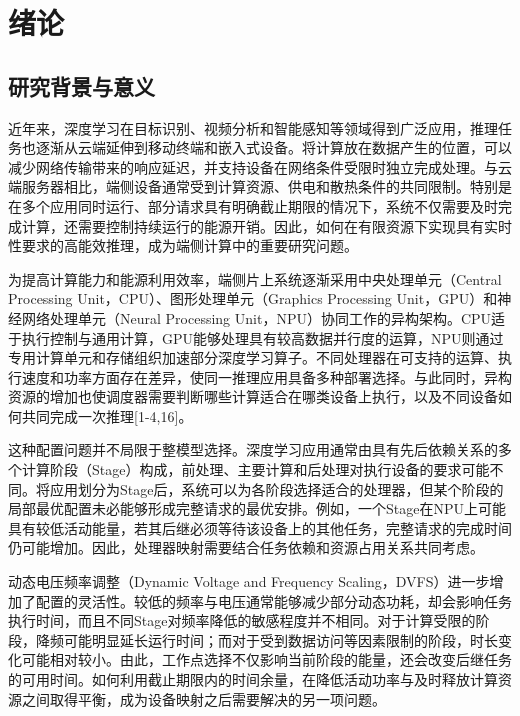 \chapter{绪论}\label{ux7eeaux8bba}

\section{研究背景与意义}\label{ux7814ux7a76ux80ccux666fux4e0eux610fux4e49}

近年来，深度学习在目标识别、视频分析和智能感知等领域得到广泛应用，推理任务也逐渐从云端延伸到移动终端和嵌入式设备。将计算放在数据产生的位置，可以减少网络传输带来的响应延迟，并支持设备在网络条件受限时独立完成处理。与云端服务器相比，端侧设备通常受到计算资源、供电和散热条件的共同限制。特别是在多个应用同时运行、部分请求具有明确截止期限的情况下，系统不仅需要及时完成计算，还需要控制持续运行的能源开销。因此，如何在有限资源下实现具有实时性要求的高能效推理，成为端侧计算中的重要研究问题。

为提高计算能力和能源利用效率，端侧片上系统逐渐采用中央处理单元（Central Processing Unit，CPU）、图形处理单元（Graphics Processing Unit，GPU）和神经网络处理单元（Neural Processing Unit，NPU）协同工作的异构架构。CPU适于执行控制与通用计算，GPU能够处理具有较高数据并行度的运算，NPU则通过专用计算单元和存储组织加速部分深度学习算子。不同处理器在可支持的运算、执行速度和功率方面存在差异，使同一推理应用具备多种部署选择。与此同时，异构资源的增加也使调度器需要判断哪些计算适合在哪类设备上执行，以及不同设备如何共同完成一次推理{[}1-4,16{]}。

这种配置问题并不局限于整模型选择。深度学习应用通常由具有先后依赖关系的多个计算阶段（Stage）构成，前处理、主要计算和后处理对执行设备的要求可能不同。将应用划分为Stage后，系统可以为各阶段选择适合的处理器，但某个阶段的局部最优配置未必能够形成完整请求的最优安排。例如，一个Stage在NPU上可能具有较低活动能量，若其后继必须等待该设备上的其他任务，完整请求的完成时间仍可能增加。因此，处理器映射需要结合任务依赖和资源占用关系共同考虑。

动态电压频率调整（Dynamic Voltage and Frequency Scaling，DVFS）进一步增加了配置的灵活性。较低的频率与电压通常能够减少部分动态功耗，却会影响任务执行时间，而且不同Stage对频率降低的敏感程度并不相同。对于计算受限的阶段，降频可能明显延长运行时间；而对于受到数据访问等因素限制的阶段，时长变化可能相对较小。由此，工作点选择不仅影响当前阶段的能量，还会改变后继任务的可用时间。如何利用截止期限内的时间余量，在降低活动功率与及时释放计算资源之间取得平衡，成为设备映射之后需要解决的另一项问题。

